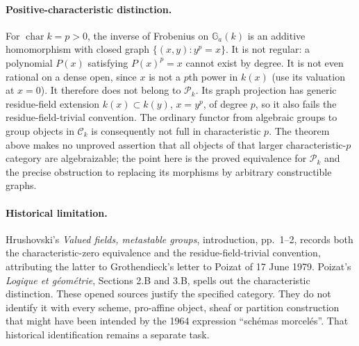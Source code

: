 \paragraph{Positive-characteristic distinction.}
For $\operatorname{char}k=p>0$, the inverse of Frobenius on
$\mathbb G_a(k)$ is an additive homomorphism with closed graph
$\{(x,y):y^p=x\}$.  It is not regular: a polynomial $P(x)$ satisfying
$P(x)^p=x$ cannot exist by degree.  It is not even rational on a dense
open, since $x$ is not a $p$th power in $k(x)$ (use its valuation at
$x=0$).  It therefore does not belong to $\mathcal P_k$.  Its graph
projection has generic residue-field extension $k(x)\subset k(y)$,
$x=y^p$, of degree $p$, so it also fails the residue-field-trivial
convention.  The ordinary functor from algebraic groups to group objects
in $\mathcal C_k$ is consequently not full in characteristic $p$.
The theorem above makes no unproved assertion that all objects of that
larger characteristic-$p$ category are algebraizable; the point here
is the proved equivalence for $\mathcal P_k$ and the precise obstruction
to replacing its morphisms by arbitrary constructible graphs.

\paragraph{Historical limitation.}
Hrushovski's \emph{Valued fields, metastable groups}, introduction,
pp.~1--2\cite[pp.~1--2 and p.~2, footnote 3]{CHrushovskiMetastableDraft}, records both the characteristic-zero equivalence and the
residue-field-trivial convention, attributing the latter to Grothendieck's
letter to Poizat of 17 June 1979.  Poizat's \emph{Logique et g\'eom\'etrie},
Sections 2.B and 3.B\cite[Sections 2.B and 3.B]{CPoizat2025}, spells out the characteristic distinction.  These
opened sources justify the specified category.  They do not identify
it with every scheme, pro-affine object, sheaf or partition construction
that might have been intended by the 1964 expression ``sch\'emas
morcel\'es''.  That historical identification remains a separate task.
